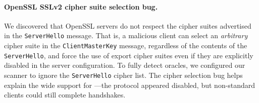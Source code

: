 \paragraph{OpenSSL SSLv2 cipher suite selection bug.}
\label{sec:openssl-selection}

We discovered that OpenSSL servers do not respect the cipher suites advertised
in the \ssltwo \texttt{ServerHello} message. That is, a malicious client can
select an \textit{arbitrary} cipher suite in the \texttt{ClientMasterKey}
message, regardless of the contents of the \texttt{ServerHello}, and force the
use of export cipher suites even if they are explicitly disabled in the server
configuration.  To fully detect \ssltwo oracles, we configured our scanner to
ignore the \texttt{ServerHello} cipher list. The cipher selection bug helps
explain the wide support for \ssltwo---the protocol appeared disabled, but 
non-standard clients could still complete handshakes.



